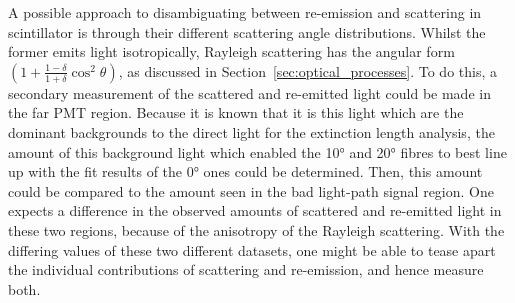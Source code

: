 A possible approach to disambiguating between re-emission and scattering in scintillator is through their different scattering angle distributions. Whilst the former emits light isotropically, Rayleigh scattering has the angular form $\left(1+\frac{1-\delta}{1+\delta}\cos^{2}\theta\right)$, as discussed in Section~\ref{sec:optical_processes}. To do this, a secondary measurement of the scattered and re-emitted light could be made in the far PMT region. Because it is known that it is this light which are the dominant backgrounds to the direct light for the extinction length analysis, the amount of this background light which enabled the \ang{10} and \ang{20} fibres to best line up with the fit results of the \ang{0} ones could be determined. Then, this amount could be compared to the amount seen in the bad light-path signal region. One expects a difference in the observed amounts of scattered and re-emitted light in these two regions, because of the anisotropy of the Rayleigh scattering. With the differing values of these two different datasets, one might be able to tease apart the individual contributions of scattering and re-emission, and hence measure both.


